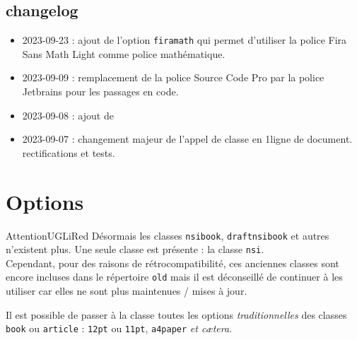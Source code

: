 \documentclass[12pt,a4paper,article]{nsi} %
\begin{document}
\maketitle

\subsection*{changelog}
\begin{itemize}
    \item 2023-09-23 : ajout de l'option \texttt{firamath} qui permet d'utiliser la police Fira Sans Math Light comme police mathématique.
    \item 2023-09-09 : remplacement de la police Source Code Pro par la police Jetbrains pour les passages en code.
    \item 2023-09-08 : ajout de \texttt{}
        \begin{center}
        \end{center}
    \item 2023-09-07 : changement majeur de l'appel de classe en 1\ere ligne de document.\\
          rectifications et tests.
\end{itemize}


\section*{Options}

\begin{encadrecolore}{Attention}{UGLiRed}
    Désormais les classes \texttt{nsibook}, \texttt{draftnsibook} et autres n'existent plus. Une seule classe est présente : la classe \texttt{nsi}.\\

    Cependant, pour des raisons de rétrocompatibilité, ces anciennes classes sont encore incluses dans le répertoire \texttt{old} mais il est déconseillé de continuer à les utiliser car elles ne sont plus maintenues / mises à jour.
\end{encadrecolore}


Il est possible de passer à la classe toutes les options \textit{traditionnelles} des classes \texttt{book} ou \texttt{article} : \texttt{12pt} ou \texttt{11pt}, \texttt{a4paper} \textit{et cætera}.\\
\end{document}
